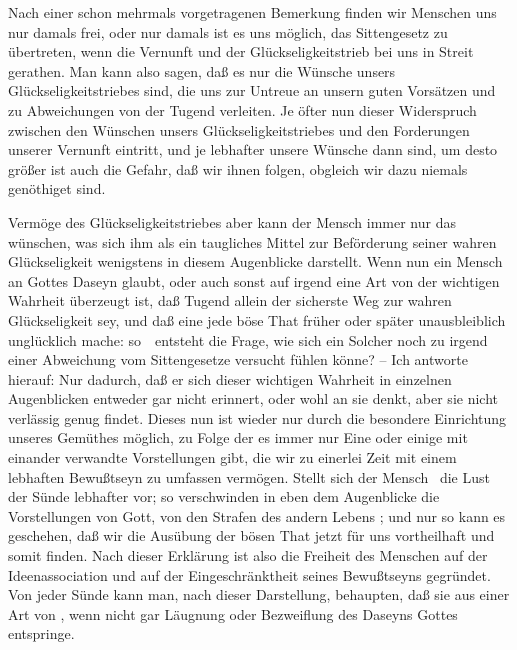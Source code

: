 \begin{aufza}
\item Nach einer schon mehrmals vorgetragenen Bemerkung finden wir Menschen uns nur damals frei, oder nur damals ist es uns möglich, das Sittengesetz zu übertreten, wenn die Vernunft und der Glückseligkeitstrieb bei uns in Streit gerathen. Man kann also sagen, daß es nur die Wünsche unsers Glückseligkeitstriebes sind, die uns zur Untreue an unsern guten Vorsätzen und zu Abweichungen von der Tugend verleiten. Je öfter nun dieser Widerspruch zwischen den Wünschen unsers Glückseligkeitstriebes und den Forderungen unserer Vernunft eintritt, und je lebhafter unsere Wünsche dann sind, um desto größer ist auch die Gefahr, daß wir ihnen folgen, obgleich wir dazu niemals genöthiget sind.
\item Vermöge des Glückseligkeitstriebes aber kann der Mensch immer nur das wünschen, was sich ihm als ein taugliches Mittel zur Beförderung seiner wahren Glückseligkeit wenigstens in diesem Augenblicke darstellt. Wenn nun ein Mensch an Gottes Daseyn glaubt, oder auch sonst auf irgend eine Art von der wichtigen Wahrheit überzeugt ist, daß Tugend allein der sicherste Weg zur wahren Glückseligkeit sey, und daß eine jede böse That früher oder später unausbleiblich unglücklich mache: so~\ entsteht die Frage, wie sich ein Solcher noch zu irgend einer Abweichung vom Sittengesetze versucht fühlen könne? -- Ich antworte hierauf: Nur dadurch, daß er sich dieser wichtigen Wahrheit in einzelnen Augenblicken entweder gar nicht erinnert, oder wohl an sie denkt, aber sie nicht verlässig genug findet. Dieses nun ist wieder nur durch die besondere Einrichtung unseres Gemüthes möglich, zu Folge der es immer nur Eine oder einige mit einander verwandte Vorstellungen gibt, die wir zu einerlei Zeit mit einem lebhaften Bewußtseyn zu umfassen vermögen. Stellt sich der Mensch \zB\ die Lust der Sünde lebhafter vor; so verschwinden in eben dem Augenblicke die Vorstellungen von Gott, von den Strafen des andern Lebens \udgl ; und nur so kann es geschehen, daß wir die Ausübung der bösen That jetzt für uns vortheilhaft und somit  finden. Nach dieser Erklärung ist also die Freiheit des Menschen auf der Ideenassociation und auf der Eingeschränktheit seines Bewußtseyns gegründet. Von jeder Sünde kann man, nach dieser Darstellung, behaupten, daß sie aus einer Art von , wenn nicht gar Läugnung oder Bezweiflung des Daseyns Gottes entspringe.
\end{aufza}

